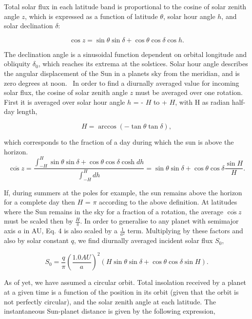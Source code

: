 \documentclass[12pt,onecolumn]{revtex4-2}    %
\begin{document}
Total solar flux in each latitude band is proportional to the cosine of solar zenith angle $z$, which is expressed  as a function of latitude $\theta$, solar hour angle $h$, and solar declination $\delta$:

\begin{equation}
\cos z = \sin \theta \sin \delta + \cos \theta \cos \delta \cos h.
\end{equation}

The declination angle is a sinusoidal function dependent on orbital longitude and obliquity $\delta_{0}$, which reaches its extrema at the solstices. Solar hour angle describes the angular displacement of the Sun in a planets sky from the meridian, and is zero degrees at noon. 
\
In order to find a diurnally averaged value for incoming solar flux, the cosine of solar zenith angle $z$ must be averaged over one rotation. First it is averaged over solar hour angle $h$ = - $H$ to + $H$, with H as radian half-day length,

\begin{equation}
H = \arccos(-\tan \theta \tan \delta),
\end{equation}

which corresponds to the fraction of a day during which the sun is above the horizon. 
\begin{equation}
\overline{\cos z} = \frac{\int_{-H}^{H} \sin\theta \sin\delta + \cos\theta \cos\delta \cosh dh}{\int_{-H}^{H} dh}
= \sin\theta \sin \delta + \cos\theta \cos\delta \frac{\sin H}{H}.
\end{equation}

If, during summers at the poles for example, the sun remains above the horizon for a complete day then $H$ = $\pi$ according to the above definition. At latitudes where the Sun remains in the sky for a fraction of a rotation, the average $\overline{\cos z}$ must be scaled then by $\frac{H}{\pi}$. In order to generalise to any planet with semimajor axis $a$ in AU, Eq. 4 is also scaled by a $\frac{1}{a^{2}}$ term. Multiplying by these factors and also by solar constant $q$, we find diurnally averaged incident solar flux $S_{0}$,

\begin{equation}
S_{0} = \frac{q}{\pi}(\frac{1.0 AU}{a})^{2}(H\sin \theta \sin \delta + \cos \theta \cos \delta \sin H).
\end{equation}

As of yet, we have assumed a circular orbit.
Total insolation received by a planet at a given time is a function of the position in its orbit (given that the orbit is not perfectly circular), and the solar zenith angle at each latitude. The instantaneous Sun-planet distance is given by the following expression,
\end{document}
